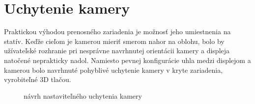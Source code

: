     \section{Uchytenie kamery}

        Praktickou výhodou prenosného zariadenia je možnosť jeho umiestnenia na statív. Keďže cieľom je kamerou mieriť smerom nahor na oblohu, bolo by užívateľské rozhranie pri nesprávne navrhnutej orientácii kamery a displeja natočené neprakticky nadol. Namiesto pevnej konfigurácie uhla medzi displejom a kamerou bolo navrhnuté pohyblivé uchytenie kamery v kryte zariadenia, vyrobiteľné 3D tlačou.

        \begin{figure}[H]
            \centering
            \caption{návrh nastaviteľného uchytenia kamery}
        \end{figure}

